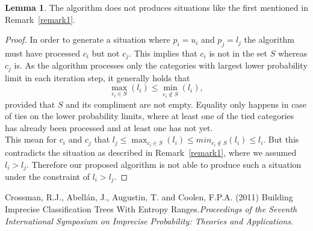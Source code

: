 \documentclass[a4paper]{article}
\theoremstyle{definition} \newtheorem{lemma}{Lemma}
\theoremstyle{remark} \newtheorem{remark}{Remark}
\begin{document}
\begin{lemma}
The algorithm does not produces situations like the first mentioned in Remark~\ref{remark1}.
\end{lemma}
\begin{proof}
In order to generate a situation where $p_i = u_i$ and $p_j = l_j$ the algorithm must have processed $c_i$ but not $c_j$. This implies that $c_i$ is not in the set $S$ whereas $c_j$ is. As the algorithm processes only the categories with largest lower probability limit in each iteration step, it generally holds that 
\begin{displaymath}
\max_{c_i \in S}(l_i) \leq \min_{c_i \notin S}(l_i),
\end{displaymath} 
provided that $S$ and its compliment are not empty. Equality only happens in case of ties on the lower probability limits, where at least one of the tied categories has already been processed and at least one has not yet.\\
This mean for $c_i$ and $c_j$ that $l_j \leq \max_{c_i \in S}(l_i) \leq min_{c_i \notin S}(l_i) \leq l_i$. But this contradicts the situation as described in Remark~\ref{remark1}, where we assumed $l_i>l_j$. Therefore our proposed algorithm is not able to produce such a situation under the constraint of $l_i>l_j$.
\end{proof}

\begin{thebibliography}{99}
 Crossman, R.J., Abell\'{a}n, J., Augustin, T. and Coolen, F.P.A. (2011) Building Imprecise Classification Trees With Entropy Ranges.\emph{Proceedings of the Seventh International Symposium on Imprecise Probability: Theories and Applications}.\\
\end{thebibliography}
\end{document}
